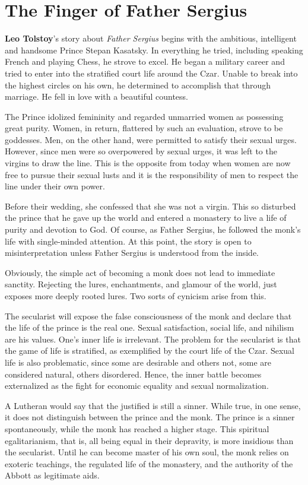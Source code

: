 \section{The Finger of Father Sergius}

\textbf{Leo Tolstoy}'s story about \emph{Father Sergius} begins with the ambitious, intelligent and handsome Prince Stepan Kasatsky. In everything he tried, including speaking French and playing Chess, he strove to excel. He began a military career and tried to enter into the stratified court life around the Czar. Unable to break into the highest circles on his own, he determined to accomplish that through marriage. He fell in love with a beautiful countess.

The Prince idolized femininity and regarded unmarried women as possessing great purity. Women, in return, flattered by such an evaluation, strove to be goddesses. Men, on the other hand, were permitted to satisfy their sexual urges. However, since men were so overpowered by sexual urges, it was left to the virgins to draw the line. This is the opposite from today when women are now free to pursue their sexual lusts and it is the responsibility of men to respect the line under their own power.

Before their wedding, she confessed that she was not a virgin. This so disturbed the prince that he gave up the world and entered a monastery to live a life of purity and devotion to God. Of course, as Father Sergius, he followed the monk's life with single-minded attention. At this point, the story is open to misinterpretation unless Father Sergius is understood from the inside.

Obviously, the simple act of becoming a monk does not lead to immediate sanctity. Rejecting the lures, enchantments, and glamour of the world, just exposes more deeply rooted lures. Two sorts of cynicism arise from this.

The secularist will expose the false consciousness of the monk and declare that the life of the prince is the real one. Sexual satisfaction, social life, and nihilism are his values. One's inner life is irrelevant. The problem for the secularist is that the game of life is stratified, as exemplified by the court life of the Czar. Sexual life is also problematic, since some are desirable and others not, some are considered natural, others disordered. Hence, the inner battle becomes externalized as the fight for economic equality and sexual normalization.

A Lutheran would say that the justified is still a sinner. While true, in one sense, it does not distinguish between the prince and the monk. The prince is a sinner spontaneously, while the monk has reached a higher stage. This spiritual egalitarianism, that is, all being equal in their depravity, is more insidious than the secularist. Until he can become master of his own soul, the monk relies on exoteric teachings, the regulated life of the monastery, and the authority of the Abbott as legitimate aids.

